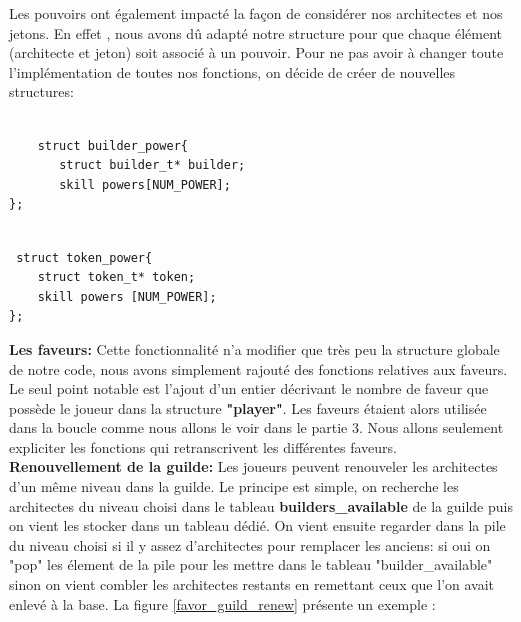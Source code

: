 \documentclass{article}
\begin{document}
 \vspace{1cm}

    Les pouvoirs ont également impacté la façon de considérer nos architectes et nos jetons. En effet , nous avons dû adapté notre structure pour que chaque élément (architecte et jeton) soit associé à un pouvoir. Pour ne pas avoir à changer toute l'implémentation de toutes nos fonctions, on décide de créer de nouvelles structures: 
\begin{lstlisting}[frame=single, caption={Implementation des supers\_builder },label=builder_power]

    struct builder_power{
	   struct builder_t* builder;
	   skill powers[NUM_POWER];
};
    \end{lstlisting}

\begin{lstlisting}[frame=single, caption={Implementation des supers\_tokens },label=token_power]

 struct token_power{
	struct token_t* token;
	skill powers [NUM_POWER];
};

    \end{lstlisting}

            
            \textbf{Les faveurs:} Cette fonctionnalité n'a modifier que très peu la structure globale de notre code, nous avons simplement rajouté des fonctions relatives aux faveurs. Le seul point notable est l'ajout d'un entier décrivant le nombre de faveur que possède le joueur dans la structure \textbf{"player"}. Les faveurs étaient alors utilisée dans la boucle comme nous allons le voir dans le partie 3.
            Nous allons seulement expliciter les fonctions qui retranscrivent les différentes faveurs. \\
            \textbf{Renouvellement de la guilde:} Les joueurs peuvent renouveler les architectes d'un même niveau dans la guilde. Le principe est simple, on recherche les architectes du niveau choisi dans le tableau \textbf{builders\_available} de la guilde puis on vient les stocker dans un tableau dédié. On vient ensuite regarder dans la pile du niveau choisi si il y assez d'architectes pour remplacer les anciens: si oui on "pop" les élement de la pile pour les mettre dans le tableau "builder\_available" sinon on vient combler les architectes restants en remettant ceux que l'on avait enlevé à la base. La figure \ref{favor_guild_renew} présente un exemple :
            
\end{document}
